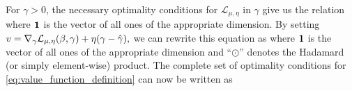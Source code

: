

For $\gamma>0$, the necessary optimality conditions 
for $\mathcal{L}_{\mu,\eta}$ in $\gamma$ give us the relation 
where $\mathbf{1}$ is the vector of all ones of the 
appropriate dimension.
By setting 
\(
v=\nabla_\gamma \mathcal{L}_{\mu,\eta}(\beta,\gamma)+\eta(\gamma - \hat \gamma),
\) 
we can rewrite this equation as
where $\mathbf{1}$ is the vector of all ones of the appropriate dimension and
``$\odot$'' denotes the Hadamard (or simply element-wise) product.
The complete set of optimality conditions for 
\eqref{eq:value_function_definition} can now be written as
